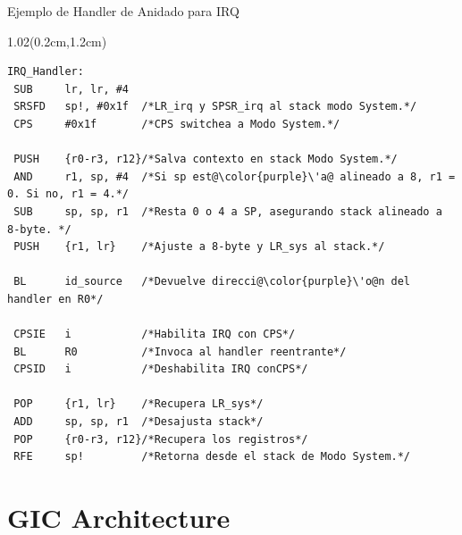 \documentclass[table,x11names,aspectratio=169]{beamer}
\begin{document}
\begin{frame}[t,fragile]{Ejemplo de Handler de Anidado para IRQ}
 \begin{textblock*}{1.02\textwidth}(0.2cm,1.2cm)
  \begin{lstlisting}[basicstyle=\scriptsize,escapechar=\@,numbers=none, frame=single, xleftmargin=20pt, xrightmargin=0pt,]
IRQ_Handler:
 SUB     lr, lr, #4
 SRSFD   sp!, #0x1f  /*LR_irq y SPSR_irq al stack modo System.*/
 CPS     #0x1f       /*CPS switchea a Modo System.*/
    
 PUSH    {r0-r3, r12}/*Salva contexto en stack Modo System.*/
 AND     r1, sp, #4  /*Si sp est@\color{purple}\'a@ alineado a 8, r1 = 0. Si no, r1 = 4.*/
 SUB     sp, sp, r1  /*Resta 0 o 4 a SP, asegurando stack alineado a 8-byte. */
 PUSH    {r1, lr}    /*Ajuste a 8-byte y LR_sys al stack.*/
    
 BL      id_source   /*Devuelve direcci@\color{purple}\'o@n del handler en R0*/

 CPSIE   i           /*Habilita IRQ con CPS*/
 BL      R0          /*Invoca al handler reentrante*/
 CPSID   i           /*Deshabilita IRQ conCPS*/

 POP     {r1, lr}    /*Recupera LR_sys*/
 ADD     sp, sp, r1  /*Desajusta stack*/
 POP     {r0-r3, r12}/*Recupera los registros*/
 RFE     sp!         /*Retorna desde el stack de Modo System.*/
  \end{lstlisting}
 \end{textblock*}
\end{frame}

\section{GIC Architecture}
\end{document}
